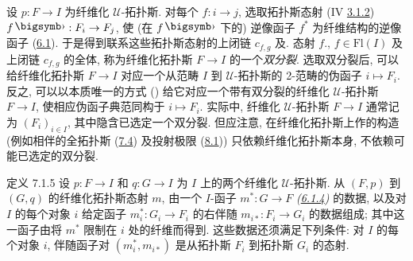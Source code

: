 \subsubsection{}

设 $p:F\to I$ 为纤维化 $𝒰$-拓扑斯.
对每个 $f:i\to j$, 选取拓扑斯态射
(IV \hyperref[IV.subsubsec3.1.2]{3.1.2}) $f\bigdot:F_i\to F_j$,
使 (在 $f\bigdot$ 下的) 逆像函子 $f^{\ast}$ 为纤维结构的逆像函子
(\hyperref[VI.def6.1]{6.1}).
于是得到联系这些拓扑斯态射的上闭链 $c_{f,g}$
 及.
态射 $f.$, $f\in\text{Fl}(I)$ 及上闭链 $c_{f,g}$ 的全体,
称为纤维化拓扑斯 $F\to I$ 的一个\emph{双分裂}.
选取双分裂后, 可以给纤维化拓扑斯 $F\to I$ 对应一个从范畴 $I$
到 $𝒰$-拓扑斯的 2-范畴\pageoriginale 的伪函子 $i\mapsto F_i$.
反之, 可以以本质唯一的方式 (\cf \cite{sga4.exp.VI.bib.5})
给它对应一个带有双分裂的纤维化 $𝒰$-拓扑斯 $F\to I$,
使相应伪函子典范同构于 $i\mapsto F_i$.
实际中, 纤维化 $𝒰$-拓扑斯 $F\to I$ 通常记为 $(F_i)_{i\in I}$,
其中隐含已选定一个双分裂.
但应注意, 在纤维化拓扑斯上作的构造
(例如相伴的全拓扑斯 (\hyperref[VI.subsec7.4]{7.4})
及投射极限 (\hyperref[VI.subsec8.1]{8.1}))
只依赖纤维化拓扑斯本身, 不依赖可能已选定的双分裂.

\begin{enonce*}{定义 7.1.5}
设 $p:F\to I$ 和 $q:G\to I$ 为 $I$ 上的两个纤维化 $𝒰$-拓扑斯.
从 $(F,p)$ 到 $(G,q)$ 的纤维化拓扑斯态射 $m$,
由一个 $I$-函子 $m^{\ast}:G\to F$
\emph{(\hyperref[VI.subsubsec6.1.4]{6.1.4})} 的数据,
以及对 $I$ 的每个对象 $i$ 给定函子 $m^{\ast}_i:G_i\to F_i$
的右伴随 $m_{i\ast}:F_i\to G_i$ 的数据组成;
其中这一函子由将 $m^{\ast}$ 限制在 $i$ 处的纤维而得到.
这些数据还须满足下列条件:
对 $I$ 的每个对象 $i$, 伴随函子对 $(m^{\ast}_i,m_{i\ast})$
是从拓扑斯 $F_i$ 到拓扑斯 $G_i$ 的态射.
\end{enonce*}

\setcounter{subsubsection}{5}
\subsubsection{}

